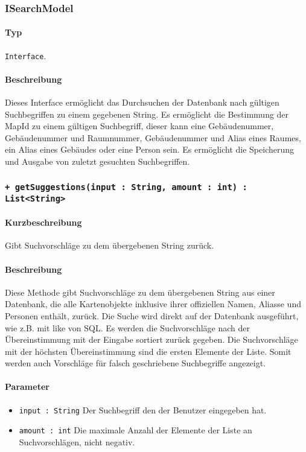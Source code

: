 \subsubsection{ISearchModel}
\paragraph*{Typ}
\texttt{Interface}.
\paragraph*{Beschreibung}
Dieses Interface ermöglicht das Durchsuchen der Datenbank nach gültigen Suchbegriffen zu einem gegebenen String.
Es ermöglicht die Bestimmung der MapId zu einem gültigen Suchbegriff, 
dieser kann eine Gebäudenummer, Gebäudenummer und Raumnummer, Gebäudenummer und Alias eines Raumes, ein Alias eines Gebäudes oder eine Person sein.
Es ermöglicht die Speicherung und Ausgabe von zuletzt gesuchten Suchbegriffen.

 \subsubsection*{\texttt{+ getSuggestions(input : String, amount : int) : List<String>}}%
\paragraph*{Kurzbeschreibung}
Gibt Suchvorschläge zu dem übergebenen String zurück.
\paragraph*{Beschreibung}
Diese Methode gibt Suchvorschläge zu dem übergebenen String aus einer Datenbank, 
die alle Kartenobjekte inklusive ihrer offiziellen Namen, Aliasse und Personen enthält, zurück.
Die Suche wird direkt auf der Datenbank ausgeführt, wie z.B. mit \dq like \dq{} von SQL.
Es werden die Suchvorschläge nach der Übereinstimmung mit der Eingabe sortiert zurück gegeben.
Die Suchvorschläge mit der höchsten Übereinstimmung sind die ersten Elemente der Liste.
Somit werden auch Vorschläge für falsch geschriebene Suchbegriffe angezeigt.
\paragraph*{Parameter}
\begin{itemize}
    \item \texttt{input : String} Der Suchbegriff den der Benutzer eingegeben hat.
    \item \texttt{amount : int} Die maximale Anzahl der Elemente der Liste an Suchvorschlägen, nicht negativ.
\end{itemize}
